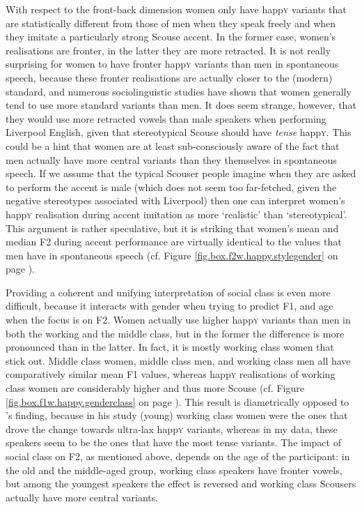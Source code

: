 With respect to the front-back dimension women only have happ\textsc{y} variants that are statistically different from those of men when they speak freely and when they imitate a particularly strong Scouse accent.
In the former case, women's realisations are fronter, in the latter they are more retracted.
It is not really surprising for women to have fronter happ\textsc{y} variants than men in spontaneous speech, because these fronter realisations are actually closer to the (modern) standard, and numerous sociolinguistic studies have shown that women generally tend to use more standard variants than men.
It does seem strange, however, that they would use more retracted vowels than male speakers when performing Liverpool English, given that stereotypical Scouse should have \emph{tense} happ\textsc{y}.
This could be a hint that women are at least sub-consciously aware of the fact that men actually have more central variants than they themselves in spontaneous speech.
If we assume that the typical Scouser people imagine when they are asked to perform the accent is male (which does not seem too far-fetched, given the negative stereotypes associated with Liverpool) then one can interpret women's happ\textsc{y} realisation during accent imitation as more `realistic' than `stereotypical'.
This argument is rather speculative, but it is striking that women's mean and median F2 during accent performance are virtually identical to the values that men have in spontaneous speech (cf. Figure \ref{fig.box.f2w.happy.stylegender} on page \pageref{fig.box.f2w.happy.stylegender}).

Providing a coherent and unifying interpretation of social class is even more difficult, because it interacts with gender when trying to predict F1, and age when the focus is on F2.
Women actually use higher happ\textsc{y} variants than men in both the working and the middle class, but in the former the difference is more pronounced than in the latter.
In fact, it is mostly working class women that stick out.
Middle class women, middle class men, and working class men all have comparatively similar mean F1 values, whereas happ\textsc{y} realisations of working class women are considerably higher and thus more Scouse (cf. Figure \ref{fig.box.f1w.happy.genderclass} on page \pageref{fig.box.f1w.happy.genderclass}).
This result is diametrically opposed to \textcite{flynn2010}'s finding, because in his study (young) working class women were the ones that drove the change towards ultra-lax happ\textsc{y} variants, whereas in my data, these speakers seem to be the ones that have the most tense variants.
The impact of social class on F2, as mentioned above, depends on the age of the participant: in the old and the middle-aged group, working class speakers have fronter vowels, but among the youngest speakers the effect is reversed and working class Scousers actually have more central variants.

